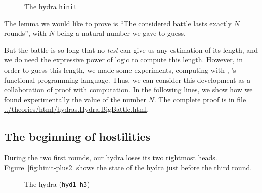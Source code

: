 \begin{figure}[h]
  \centering

  \caption{The hydra \texttt{hinit}}
  \label{fig:hinit}
\end{figure}





The lemma we would like to prove is ``The considered battle lasts exactly $N$ rounds'',
with $N$ being a natural number we gave to guess.

But the  battle is so long that no \emph{test} can give us any estimation of its length, and we do need the expressive power of logic to compute this length. However, in order to  guess this length, we made some experiments, computing with \gallina{}, \coq{}'s  functional programming language.
Thus, we can consider this development as a collaboration of proof with computation.
In the following lines, we show how we found experimentally the value of the number $N$.
The complete proof is in file \url{../theories/html/hydras.Hydra.BigBattle.html}. 

\subsection{The beginning of hostilities}
During the two first rounds, our hydra loses its two rightmost heads.  Figure~\vref{fig:hinit-plus2} shows the state of the hydra   just before the third round.


\begin{figure}[h]
  \centering

  \caption{The hydra (\texttt{hyd1 h3})}
  \label{fig:hinit-plus2}
\end{figure}

